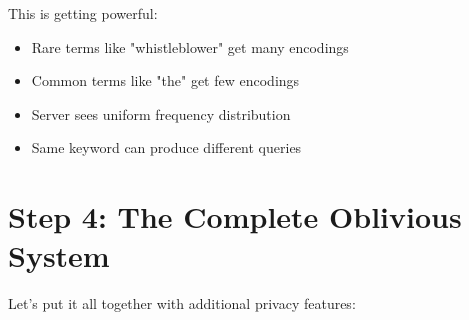 This is getting powerful:
\begin{itemize}
    \item Rare terms like "whistleblower" get many encodings
    \item Common terms like "the" get few encodings
    \item Server sees uniform frequency distribution
    \item Same keyword can produce different queries
\end{itemize}

\section{Step 4: The Complete Oblivious System}

Let's put it all together with additional privacy features:

